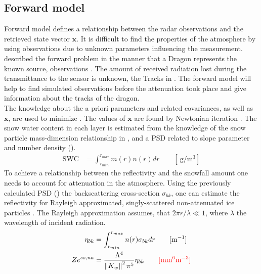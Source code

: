 \subsection{Forward model}\label{sec:forward_model}

Forward model defines a relationship between the radar observations and the retrieved state vector $\mathbf{x}$. It is difficult to find the properties of the atmosphere by using observations due to unknown parameters influencing the measurement. \\
\cite{stephens_remote_1994} described the forward problem in the manner that a Dragon represents the known source, observations . The amount of received radiation lost during the transmittance to the sensor is unknown, the Tracks in . The forward model will help to find simulated observations before the attenuation took place and give information about the tracks of the dragon.  
\\
The knowledge about the a priori parameters and related covariances, as well as $\mathbf{x}$, are used to minimize . The values of $\mathbf{x}$ are found by Newtonian iteration \cite[Eq. 5]{wood_estimating_2014}.
\newline
The snow water content in each layer is estimated from the knowledge of the snow particle mass-dimension relationship in , and a PSD related to slope parameter and number density (). %
\begin{align}
\text{SWC} & = \int_{r_{min}}^{r_{max}} m(r) n(r) dr \qquad [\SI{}{\gram\per\cubic\metre}] \label{eq:SWC}
\end{align}
To achieve a relationship between the reflectivity and the snowfall amount one needs to account for attenuation in the atmosphere. Using the previously calculated PSD () the backscattering cross-section $\sigma_{bk}$, one can estimate the reflectivity for Rayleigh approximated, singly-scattered non-attenuated ice particles \citep{lecuyer_estimation-based_2002,kulie_utilizing_2009,wood_microphysical_2015}. The Rayleigh approximation assumes, that $2\pi r/\lambda \ll 1$, where $\lambda$ the wavelength of incident radiation.
\begin{align}
\eta_{bk} & = \int_{r_{min}}^{r_{max}} n(r) \sigma_{bk} dr \qquad [\SI{}{\per\metre}] \nonumber \\
Ze^{ss,na} & = \frac{\Lambda^4}{\left\| K_w \right\|^2 \pi^5} \eta_{bk} \qquad \textcolor{red}{[\SI{}{\mm^6\metre^{-3}}]} \label{eq:singleZ}
\end{align}
